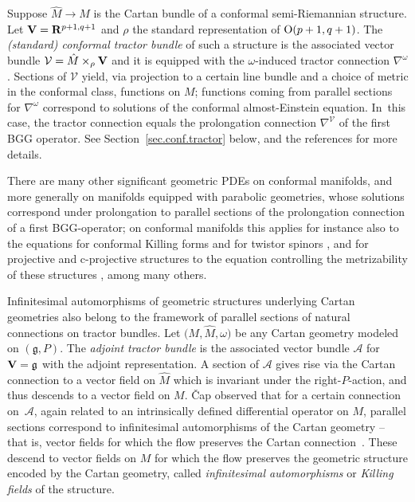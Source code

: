 \documentclass[10pt,a4paper]{amsart}
\numberwithin{equation}{section}
\theoremstyle{definition}
\newcommand{\BR}{{\bf R}}
\newcommand{\lieg}{\mathfrak{g}}
\begin{document}
Suppose $\hat{M} \rightarrow M$ is the Cartan bundle of a conformal
semi-Riemannian structure. Let ${\bf V} = \BR^{p+1,q+1}$
and $\rho$ the standard representation of ${\rm O}(p+1,q+1)$. The
\emph{(standard) conformal tractor bundle} of such a structure is the associated
vector bundle $\mathcal{V} = \hat{M} \times_\rho {\bf V}$ and it is equipped with the $\omega$-induced tractor connection $\nabla^{\omega}$.
Sections of
$\mathcal{V}$ yield, via projection to a certain line bundle
and a choice of metric in the conformal class,
functions on $M$; functions coming from parallel sections for
$\nabla^{\mathcal{\omega}}$ correspond to
solutions of the conformal almost-Einstein equation. In~this case, the
tractor connection equals the prolongation connection $\nabla^{\mathcal V}$ of the first BGG operator.
See Section~\ref{sec.conf.tractor} below, and the references \cite{cap.gover.tractor.calc, curry.gover.tractors} for more details.

 There are many other significant geometric PDEs on conformal manifolds, and more generally on manifolds equipped with parabolic geometries, whose solutions correspond under prolongation
 to parallel sections of the prolongation connection of a first BGG-operator; on conformal manifolds this applies for instance also to the equations for conformal Killing forms \cite{GoverSilhan, Semmelmann} and for twistor spinors \cite{BFGK}, and for projective and
 c-projective structures to the equation controlling the metrizability of these structures \cite{cemn.cproj, eastwood.matveev.proj.tractor}, among many others.

Infinitesimal automorphisms of geometric structures underlying Cartan geometries also belong to the framework of parallel
sections of natural connections on tractor bundles. Let $\bigl(M, \hat{M}, \omega\bigr)$ be any Cartan geometry modeled on
$(\lieg,P)$. The \emph{adjoint tractor bundle} is the associated vector
bundle $\mathcal{A}$ for ${\bf V} = \lieg$ with the adjoint
representation. A section of $\mathcal{A}$ gives rise via the Cartan
connection to a vector field on $\hat{M}$ which is invariant under the
right-$P$-action, and thus descends to a vector field on $M$.
\v{C}ap observed that for a certain connection on~$\mathcal{A}$,
again related to an intrinsically defined differential operator on $M$, parallel sections correspond to
infinitesimal automorphisms of the Cartan geometry -- that is, vector
fields for which the flow preserves the Cartan connection~\cite{cap.deformations}. These
descend to vector fields on $M$ for which the flow preserves the
geometric structure encoded by the Cartan geometry, called
\emph{infinitesimal automorphisms} or \emph{Killing fields} of the structure.
\end{document}
